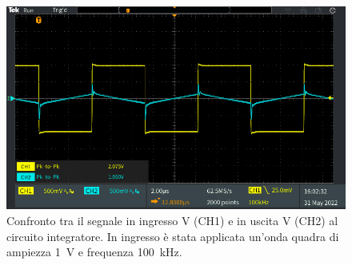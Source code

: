 \begin{figure}[h!]
	\centering
	\includegraphics[width=1\linewidth]{./ImageFiles/Laboratorio 4/TEK00016}
	\caption{Confronto tra il segnale in ingresso V (CH1)  e in uscita V (CH2) al circuito integratore. In ingresso è stata applicata un'onda quadra di ampiezza \SI{1}{\volt} e frequenza \SI{100}{\kilo\hertz}.}
	\label{fig:opamp_int_quadra}
\end{figure}